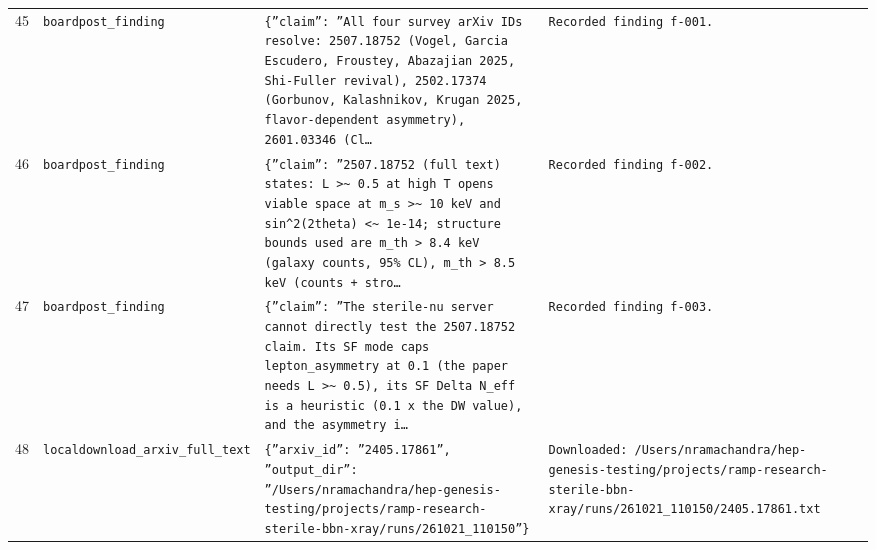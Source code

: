 \documentclass[11pt,a4paper]{article}
\begin{document}
\begin{longtable}{@{}p{}p{}p{}p{}@{}}
45 & \texttt{board}\newline\texttt{post\_\allowbreak{}finding} & \texttt{\{''claim'':\allowbreak{} ''All four survey arXiv IDs resolve:\allowbreak{} 2507.18752 (Vogel,\allowbreak{} Garcia Escudero,\allowbreak{} Froustey,\allowbreak{} Abazajian 2025,\allowbreak{} Shi-Fuller revival)\allowbreak{},\allowbreak{} 2502.17374 (Gorbunov,\allowbreak{} Kalashnikov,\allowbreak{} Krugan 2025,\allowbreak{} flavor-dependent asymmetry)\allowbreak{},\allowbreak{} 2601.03346 (Cl\ldots{}\allowbreak{}} & \texttt{Recorded finding f-001.} \\
46 & \texttt{board}\newline\texttt{post\_\allowbreak{}finding} & \texttt{\{''claim'':\allowbreak{} ''2507.18752 (full text)\allowbreak{} states:\allowbreak{} L \textgreater{}\allowbreak{}\textasciitilde{}\allowbreak{} 0.5 at high T opens viable space at m\_\allowbreak{}s \textgreater{}\allowbreak{}\textasciitilde{}\allowbreak{} 10 keV and sin\textasciicircum{}\allowbreak{}2(2theta)\allowbreak{} \textless{}\allowbreak{}\textasciitilde{}\allowbreak{} 1e-14;\allowbreak{} structure bounds used are m\_\allowbreak{}th \textgreater{}\allowbreak{} 8.4 keV (galaxy counts,\allowbreak{} 95\% CL)\allowbreak{},\allowbreak{} m\_\allowbreak{}th \textgreater{}\allowbreak{} 8.5 keV (counts + stro\ldots{}\allowbreak{}} & \texttt{Recorded finding f-002.} \\
47 & \texttt{board}\newline\texttt{post\_\allowbreak{}finding} & \texttt{\{''claim'':\allowbreak{} ''The sterile-nu server cannot directly test the 2507.18752 claim. Its SF mode caps lepton\_\allowbreak{}asymmetry at 0.1 (the paper needs L \textgreater{}\allowbreak{}\textasciitilde{}\allowbreak{} 0.5)\allowbreak{},\allowbreak{} its SF Delta N\_\allowbreak{}eff is a heuristic (0.1 x the DW value)\allowbreak{},\allowbreak{} and the asymmetry i\ldots{}\allowbreak{}} & \texttt{Recorded finding f-003.} \\
48 & \texttt{local}\newline\texttt{download\_\allowbreak{}arxiv\_\allowbreak{}full\_\allowbreak{}text} & \texttt{\{''arxiv\_\allowbreak{}id'':\allowbreak{} ''2405.17861'',\allowbreak{} ''output\_\allowbreak{}dir'':\allowbreak{} ''/\allowbreak{}Users/\allowbreak{}nramachandra/\allowbreak{}hep-genesis-testing/\allowbreak{}projects/\allowbreak{}ramp-research-sterile-bbn-xray/\allowbreak{}runs/\allowbreak{}261021\_\allowbreak{}110150''\}\allowbreak{}} & \texttt{Downloaded:\allowbreak{} /\allowbreak{}Users/\allowbreak{}nramachandra/\allowbreak{}hep-genesis-testing/\allowbreak{}projects/\allowbreak{}ramp-research-sterile-bbn-xray/\allowbreak{}runs/\allowbreak{}261021\_\allowbreak{}110150/\allowbreak{}2405.17861.txt} \\

\end{longtable}
\end{document}
